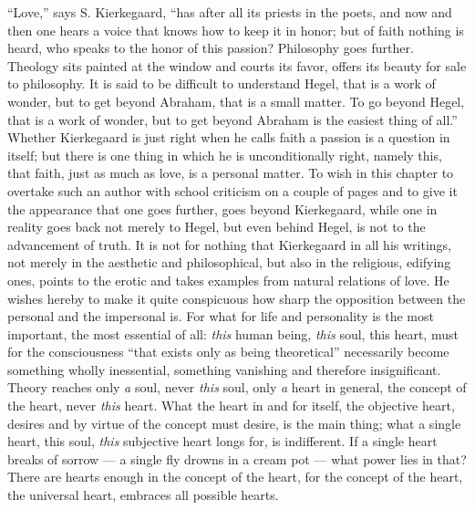 \documentclass[12pt,a4paper,openany]{book}
\newcommand{\opage}[1]{\marginnote{\footnotesize\textit{[#1]}}}
\begin{document}
``Love,'' says S. Kierkegaard, ``has after all
its priests in the poets, and now and then one hears a voice
that knows how to keep it in honor; but of faith nothing is
heard, who speaks to the honor of this passion? Philosophy
goes further. Theology sits painted at the
window and courts its favor, offers its beauty for sale
to philosophy. It is said to be difficult to understand
Hegel, that is a work of wonder, but to get beyond
Abraham, that is a small matter. To go beyond Hegel,
that is a work of wonder, but to get beyond Abraham
is the easiest thing of all.'' Whether Kierkegaard is just
right when he calls faith a passion is a
question in itself; but there is one thing in which he is unconditionally
right, namely this, that faith, just as much as
love, is a personal matter. To wish in this
chapter to overtake such an author with school criticism
on a couple of pages and to give it the appearance that one
goes further, goes beyond Kierkegaard, while
one in reality goes back not merely to Hegel,
but even behind Hegel, is not to the advancement of truth.
It is not for nothing that Kierkegaard in all
\setcounter{footnote}{0}%
\opage{593}his writings, not merely in the aesthetic and philosophical,
but also in the religious, edifying ones, points to
the erotic and takes examples from natural relations of love.
He wishes hereby to make it quite conspicuous
how sharp the opposition between the personal
and the impersonal is. For what for life and personality
is the most important, the most essential of all: \emph{this}
human being, \emph{this} soul, this heart, must for the consciousness
``that exists only as being theoretical''
necessarily become something wholly inessential, something
vanishing and therefore insignificant. Theory reaches
only \emph{a} soul, never \emph{this} soul, only \emph{a} heart
in general, the concept of the heart, never \emph{this} heart.
What the heart in and for itself, the objective heart, desires
and by virtue of the concept must desire, is the main thing; what
a single heart, this soul, \emph{this} subjective heart
longs for, is indifferent. If a single heart breaks of
sorrow --- a single fly drowns in a cream pot --- what
power lies in that? There are hearts enough in the
concept of the heart, for the concept of the heart, the universal heart, embraces
all possible hearts.
\end{document}
